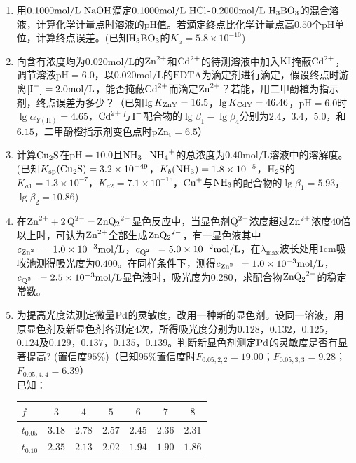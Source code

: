 \begin{enumerate}[label=\arabic*., itemsep=1.5ex]
    \item 用$0.1000\mathrm{mol/L}\ \ce{NaOH}$滴定$0.1000\mathrm{mol/L}\ \ce{HCl}$-$0.2000\mathrm{mol/L}\ \ce{H3BO3}$的混合溶液，计算化学计量点时溶液的$\mathrm{pH}$值。若滴定终点比化学计量点高$0.50$个$\mathrm{pH}$单位，计算终点误差。(已知$\ce{H3BO3}$的$K_a=5.8\times10^{-10}$)
    \item 向含有浓度均为$0.020\mathrm{mol/L}$的$\ce{Zn^{2+}}$和$\ce{Cd^{2+}}$的待测溶液中加入$\ce{KI}$掩蔽$\ce{Cd^{2+}}$，调节溶液$\mathrm{pH}=6.0$，以$0.020\mathrm{mol/L}$的$\mathrm{EDTA}$为滴定剂进行滴定，假设终点时游离$[\ce{I^-}]=2.0\mathrm{mol/L}$，能否掩蔽$\ce{Cd^{2+}}$而滴定$\ce{Zn^{2+}}$？若能，用二甲酚橙为指示剂，终点误差为多少？（已知$\lg K_{\ce{ZnY}}=16.5$，$\lg K_{\ce{CdY}}=46.46$，$\mathrm{pH}=6.0$时$\lg\alpha_{Y(\mathrm{H})}=4.65$，$\ce{Cd^{2+}}$与$\ce{I^-}$配合物的$\lg\beta_1-\lg\beta_4$分别为$2.4$，$3.4$，$5.0$，和$6.15$，二甲酚橙指示剂变色点时$\mathrm{pZn_t}=6.5$）
    \item 计算$\ce{Cu2S}$在$\mathrm{pH}=10.0$且$\ce{NH3-NH4+}$的总浓度为$0.40\mathrm{mol/L}$溶液中的溶解度。(已知$K_{\mathrm{sp}}(\ce{Cu2S})=3.2\times10^{-49}$，$K_b(\ce{NH3})=1.8\times10^{-5}$，$\ce{H2S}$的$K_{a1}=1.3\times10^{-7}$，$K_{a2}=7.1\times10^{-15}$，$\ce{Cu^+}$与$\ce{NH3}$的配合物的$\lg\beta_1=5.93$，$\lg\beta_2=10.86$)
    \item 在$\ce{Zn^{2+} + 2Q^{2-} = ZnQ_2^{2-}}$显色反应中，当显色剂$\ce{Q^{2-}}$浓度超过$\ce{Zn^{2+}}$浓度$40$倍以上时，可认为$\ce{Zn^{2+}}$全部生成$\ce{ZnQ_2^{2-}}$，有一显色液其中$c_{\ce{Zn^{2+}}}=1.0\times10^{-3}\mathrm{mol/L}$，$c_{\ce{Q^{2-}}}=5.0\times10^{-2}\mathrm{mol/L}$，在$\lambda_{\mathrm{max}}$波长处用$1\mathrm{cm}$吸收池测得吸光度为$0.400$。在同样条件下，测得$c_{\ce{Zn^{2+}}}=1.0\times10^{-3}\mathrm{mol/L}$，$c_{\ce{Q^{2-}}}=2.5\times10^{-3}\mathrm{mol/L}$显色液时，吸光度为$0.280$，求配合物$\ce{ZnQ_2^{2-}}$的稳定常数。
    \item 为提高光度法测定微量$\ce{Pd}$的灵敏度，改用一种新的显色剂。设同一溶液，用原显色剂及新显色剂各测定$4$次，所得吸光度分别为$0.128$，$0.132$，$0.125$，$0.124$及$0.129$，$0.137$，$0.135$，$0.139$。判断新显色剂测定$\ce{Pd}$的灵敏度是否有显著提高? (置信度$95\%$)（已知$95\%$置信度时$F_{0.05,2,2}=19.00$；$F_{0.05,3,3}=9.28$；$F_{0.05,4,4}=6.39$）
    \\
    已知：
    \begin{center}
    \begin{tabular}{l|cccccc}
    $f$ & $3$ & $4$ & $5$ & $6$ & $7$ & $8$ \\
    \hline
    $t_{0.05}$ & $3.18$ & $2.78$ & $2.57$ & $2.45$ & $2.36$ & $2.31$ \\
    \hline
    $t_{0.10}$ & $2.35$ & $2.13$ & $2.02$ & $1.94$ & $1.90$ & $1.86$ \\
    \end{tabular}
    \end{center}
\end{enumerate}